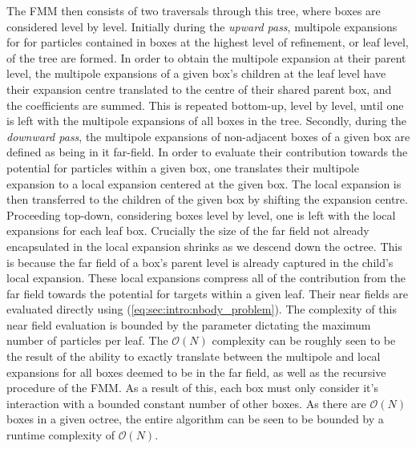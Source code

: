 \documentclass{IEEEcsmag}
\begin{document}
The FMM then consists of two traversals through this tree, where boxes are considered level by level. Initially during the \textit{upward pass}, multipole expansions for for particles contained in boxes at the highest level of refinement, or leaf level, of the tree are formed. In order to obtain the multipole expansion at their parent level, the multipole expansions of a given box's children at the leaf level have their expansion centre translated to the centre of their shared parent box, and the coefficients are summed. This is repeated bottom-up, level by level, until one is left with the multipole expansions of all boxes in the tree. Secondly, during the \textit{downward pass}, the multipole expansions of non-adjacent boxes of a given box are defined as being in it far-field. In order to evaluate their contribution towards the potential for particles within a given box, one translates their multipole expansion to a local expansion centered at the given box. The local expansion is then transferred to the children of the given box by shifting the expansion centre. Proceeding top-down, considering boxes level by level, one is left with the local expansions for each leaf box. Crucially the size of the far field not already encapsulated in the local expansion shrinks as we descend down the octree. This is because the far field of a box's parent level is already captured in the child's local expansion. These local expansions compress all of the contribution from the far field towards the potential for targets within a given leaf. Their near fields are evaluated directly using (\ref{eq:sec:intro:nbody_problem}). The complexity of this near field evaluation is bounded by the parameter dictating the maximum number of particles per leaf. The $\mathcal{O}(N)$ complexity can be roughly seen to be the result of the ability to exactly translate between the multipole and local expansions for all boxes deemed to be in the far field, as well as the recursive procedure of the FMM. As a result of this, each box must only consider it's interaction with a bounded constant number of other boxes. As there are $\mathcal{O}(N)$ boxes in a given octree, the entire algorithm can be seen to be bounded by a runtime complexity of $\mathcal{O}(N)$.
\end{document}
